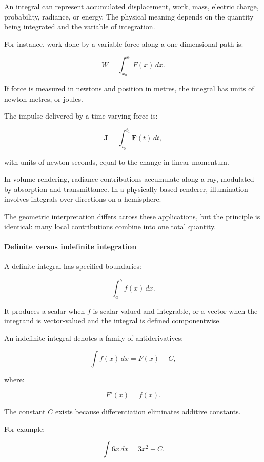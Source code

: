 An integral can represent accumulated displacement, work, mass, electric charge, probability, radiance, or energy. The physical meaning depends on the quantity being integrated and the variable of integration.

For instance, work done by a variable force along a one-dimensional path is:

\[
W=\int_{x_0}^{x_1}F(x)\,dx.
\]

If force is measured in newtons and position in metres, the integral has units of newton-metres, or joules.

The impulse delivered by a time-varying force is:

\[
\mathbf J=\int_{t_0}^{t_1}\mathbf F(t)\,dt,
\]

with units of newton-seconds, equal to the change in linear momentum.

In volume rendering, radiance contributions accumulate along a ray, modulated by absorption and transmittance. In a physically based renderer, illumination involves integrals over directions on a hemisphere.

The geometric interpretation differs across these applications, but the principle is identical: many local contributions combine into one total quantity.

\paragraph{Definite versus indefinite integration}\label{02-foundations-ii-ch022-definite-versus-indefinite-integration}

\hypertarget{02-foundations-ii-ch022-definite-versus-indefinite-integration}{}

A definite integral has specified boundaries:

\[
\int_a^b f(x)\,dx.
\]

It produces a scalar when \(f\) is scalar-valued and integrable, or a vector when the integrand is vector-valued and the integral is defined componentwise.

An indefinite integral denotes a family of antiderivatives:

\[
\int f(x)\,dx=F(x)+C,
\]

where:

\[
F'(x)=f(x).
\]

The constant \(C\) exists because differentiation eliminates additive constants.

For example:

\[
\int 6x\,dx=3x^2+C.
\]

